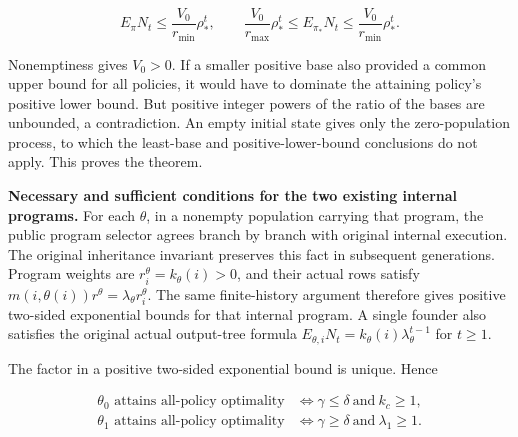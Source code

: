 \documentclass[
  english,
  11pt,
  oneside]{book}
\newcounter{none} %
\begin{document}
\[E_\pi N_t\le\frac{V_0}{r_{\min}}\rho_*^t,\qquad
\frac{V_0}{r_{\max}}\rho_*^t
\le E_{\pi_*}N_t\le
\frac{V_0}{r_{\min}}\rho_*^t.\]

Nonemptiness gives \(V_0>0\). If a smaller positive base also provided a common upper bound for all policies, it would have to dominate the attaining policy's positive lower bound. But positive integer powers of the ratio of the bases are unbounded, a contradiction. An empty initial state gives only the zero-population process, to which the least-base and positive-lower-bound conclusions do not apply. This proves the theorem.

\textbf{Necessary and sufficient conditions for the two existing internal programs.} For each \(\theta\), in a nonempty population carrying that program, the public program selector agrees branch by branch with original internal execution. The original inheritance invariant preserves this fact in subsequent generations. Program weights are \(r^\theta_i=k_\theta(i)>0\), and their actual rows satisfy \(m(i,\theta(i))r^\theta=\lambda_\theta r^\theta_i\). The same finite-history argument therefore gives positive two-sided exponential bounds for that internal program. A single founder also satisfies the original actual output-tree formula \(E_{\theta,i}N_t=k_\theta(i)\lambda_\theta^{t-1}\) for \(t\ge1\).

The factor in a positive two-sided exponential bound is unique. Hence

\[\boxed{
\begin{aligned}
\theta_0\text{ attains all-policy optimality}
&\iff \gamma\le\delta\ \text{and}\ k_c\ge1,\\
\theta_1\text{ attains all-policy optimality}
&\iff \gamma\ge\delta\ \text{and}\ \lambda_1\ge1.
\end{aligned}}\]
\end{document}
